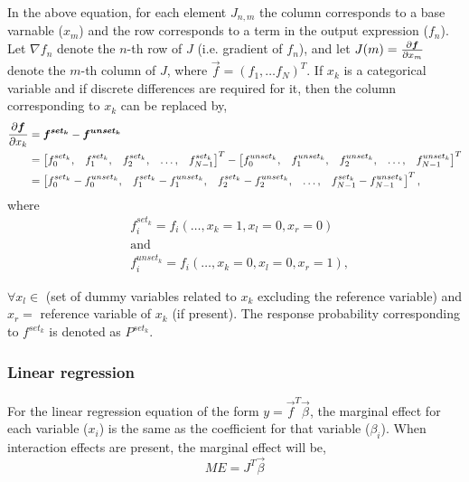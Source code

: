 In the above equation, for each element $J_{n,m}$ the column
corresponds to a base varnable ($x_m$) and the row corresponds to a term in
the output expression ($f_n$).
Let $\nabla f_n$ denote the $n$-th row of $J$ (i.e. gradient of $f_n$),
and let $J(m) = \pder[\vec{f}]{x_m}$ denote the $m$-th column of $J$, where $\vec{f} = (f_1, \ldots f_N)^T$.
If $x_k$ is a categorical variable and if discrete differences are required
for it, then the column corresponding to $x_k$ can be replaced by,
\begin{align*}
\pder[\vec{f}]{x_k} &= \vec{f^{set_k}} - \vec{f^{unset_k}} \\
    &= \begin{bmatrix}
        f_0^{set_k} , & f_1^{set_k}, & f_2^{set_k} , & \ldots, & f_{N - 1}^{set_k}
    \end{bmatrix}^T -
        \begin{bmatrix}
        f_0^{unset_k} , & f_1^{unset_k}, & f_2^{unset_k} , & \ldots, & f_{N - 1}^{unset_k}
    \end{bmatrix}^T \\
    &= \begin{bmatrix}
        f_0^{set_k} - f_0^{unset_k}, & f_1^{set_k} - f_1^{unset_k}, &
        f_2^{set_k} - f_2^{unset_k}, & \ldots, & f_{N - 1}^{set_k} - f_{N - 1}^{unset_k}
    \end{bmatrix}^T,
\end{align*}
where
\begin{align*}
    & f_i^{set_k} = f_i(\ldots, x_k=1, x_l=0, x_r=0) \\
    & \text{and} \\
    & f_i^{unset_k} = f_i(\ldots, x_k=0, x_l=0, x_r=1),
\end{align*}

$\forall x_l \in$ (set of dummy variables related to $x_k$ excluding the
reference variable) and $x_r = $ reference variable of $x_k$ (if present). The
response probability corresponding to $f^{set_k}$ is denoted as $P^{set_k}$.


\subsubsection{Linear regression} %
\label{ssub:linear_regression}
For the linear regression equation of the form $y = \vec{f}^T \vec{\beta}$,
the marginal effect for each variable ($x_i$) is the same as the coefficient for
that variable ($\beta_i$). When interaction effects are present, the marginal effect
will be,
$$
    \mathit{ME} = J^T \vec{\beta}
$$

